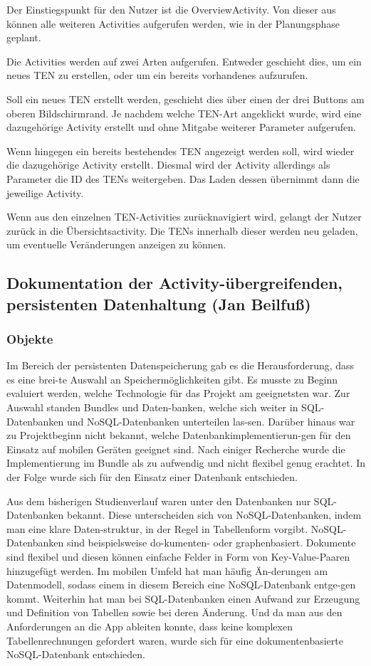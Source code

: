 Der Einstiegspunkt für den Nutzer ist die OverviewActivity. Von dieser aus können alle weiteren Activities aufgerufen werden, wie in der Planungsphase geplant.

Die Activities werden auf zwei Arten aufgerufen. Entweder geschieht dies, um ein neues TEN zu erstellen, oder um ein bereits vorhandenes aufzurufen.

Soll ein neues TEN erstellt werden, geschieht dies über einen der drei Buttons am oberen Bildschirmrand. Je nachdem welche TEN-Art angeklickt wurde, wird eine dazugehörige Activity erstellt und ohne Mitgabe weiterer Parameter aufgerufen.

Wenn hingegen ein bereits bestehendes TEN angezeigt werden soll, wird wieder die dazugehörige Activity erstellt. Diesmal wird der Activity allerdings als Parameter die ID des TENs weitergeben. Das Laden dessen übernimmt dann die jeweilige Activity.

Wenn aus den einzelnen TEN-Activities zurücknavigiert wird, gelangt der Nutzer zurück in die Übersichtsactivity. Die TENs innerhalb dieser werden neu geladen, um eventuelle Veränderungen anzeigen zu können.

\subsection{Dokumentation der Activity-übergreifenden, persistenten Datenhaltung (Jan Beilfuß)}

\subsubsection{Objekte}
Im Bereich der persistenten Datenspeicherung gab es die Herausforderung, dass es eine brei-te Auswahl an Speichermöglichkeiten gibt. Es musste zu Beginn evaluiert werden, welche Technologie für das Projekt am geeignetsten war. Zur Auswahl standen Bundles und Daten-banken, welche sich weiter in SQL-Datenbanken und NoSQL-Datenbanken unterteilen las-sen. Darüber hinaus war zu Projektbeginn nicht bekannt, welche Datenbankimplementierun-gen für den Einsatz auf mobilen Geräten geeignet sind. Nach einiger Recherche wurde die Implementierung im Bundle als zu aufwendig und nicht flexibel genug erachtet. In der Folge wurde sich für den Einsatz einer Datenbank entschieden.

Aus dem bisherigen Studienverlauf waren unter den Datenbanken nur SQL-Datenbanken bekannt. Diese unterscheiden sich von NoSQL-Datenbanken, indem man eine klare Daten-struktur, in der Regel in Tabellenform vorgibt. NoSQL-Datenbanken sind beispielsweise do-kumenten- oder graphenbasiert. Dokumente sind flexibel und diesen können einfache Felder in Form von Key-Value-Paaren hinzugefügt werden. Im mobilen Umfeld hat man häufig Än-derungen am Datenmodell, sodass einem in diesem Bereich eine NoSQL-Datenbank entge-gen kommt. Weiterhin hat man bei SQL-Datenbanken einen Aufwand zur Erzeugung und Definition von Tabellen sowie bei deren Änderung. Und da man aus den Anforderungen an die App ableiten konnte, dass keine komplexen Tabellenrechnungen gefordert waren, wurde sich für eine dokumentenbasierte NoSQL-Datenbank entschieden. 

